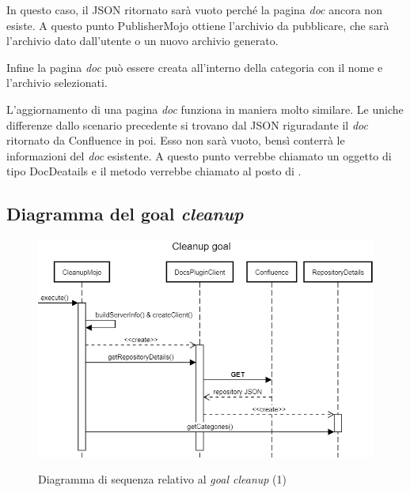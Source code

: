 In questo caso, il JSON ritornato sarà vuoto perché la pagina \emph{doc} ancora non esiste.
A questo punto PublisherMojo ottiene l'archivio da pubblicare, che sarà l'archivio dato dall'utente o un nuovo archivio generato.

Infine la pagina \emph{doc} può essere creata all'interno della categoria con il nome e l'archivio selezionati.


L'aggiornamento di una pagina \emph{doc} funziona in maniera molto similare.
Le uniche differenze dallo scenario precedente si trovano dal JSON riguradante il \emph{doc} ritornato da Confluence in poi.
Esso non sarà vuoto, bensì conterrà le informazioni del \emph{doc} esistente.
A questo punto verrebbe chiamato un oggetto di tipo DocDeatails e il metodo  verrebbe chiamato al posto di .


\subsection{Diagramma del goal \emph{cleanup}}


\begin{figure}[H]
    \centering
    \includegraphics[width=\textwidth]{immagini/CleanupSeq1.png}\\
    \caption{Diagramma di sequenza relativo al \emph{goal cleanup} (1)}
\end{figure}

